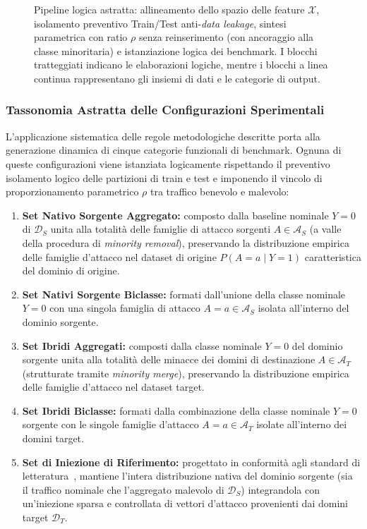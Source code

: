 \begin{figure}[H]
    \caption{Pipeline logica astratta: allineamento dello spazio delle feature $\mathcal{X}$, isolamento preventivo Train/Test anti-\textit{data leakage}, sintesi parametrica con ratio $\rho$ senza reinserimento (con ancoraggio alla classe minoritaria) e istanziazione logica dei benchmark. I blocchi tratteggiati indicano le elaborazioni logiche, mentre i blocchi a linea continua rappresentano gli insiemi di dati e le categorie di output.}
    \label{fig:flusso_benchmark}
\end{figure}

\subsubsection{Tassonomia Astratta delle Configurazioni Sperimentali}
\label{subsubsec:tassonomia_configurazioni}
L'applicazione sistematica delle regole metodologiche descritte porta alla generazione dinamica di cinque categorie funzionali di benchmark. Ognuna di queste configurazioni viene istanziata logicamente rispettando il preventivo isolamento logico delle partizioni di train e test e imponendo il vincolo di proporzionamento parametrico $\rho$ tra traffico benevolo e malevolo:
\begin{enumerate}
    \item \textbf{Set Nativo Sorgente Aggregato:} composto dalla baseline nominale $Y=0$ di $\mathcal{D}_S$ unita alla totalità delle famiglie di attacco sorgenti $A \in \mathcal{A}_S$ (a valle della procedura di \textit{minority removal}), preservando la distribuzione empirica delle famiglie d'attacco nel dataset di origine $P(A = a \mid Y = 1)$ caratteristica del dominio di origine.
    \item \textbf{Set Nativi Sorgente Biclasse:} formati dall'unione della classe nominale $Y=0$ con una singola famiglia di attacco $A = a \in \mathcal{A}_S$ isolata all'interno del dominio sorgente.
    \item \textbf{Set Ibridi Aggregati:} composti dalla classe nominale $Y=0$ del dominio sorgente unita alla totalità delle minacce dei domini di destinazione $A \in \mathcal{A}_T$ (strutturate tramite \textit{minority merge}), preservando la distribuzione empirica delle famiglie d'attacco nel dataset target.
    \item \textbf{Set Ibridi Biclasse:} formati dalla combinazione della classe nominale $Y=0$ sorgente con le singole famiglie d'attacco $A = a \in \mathcal{A}_T$ isolate all'interno dei domini target.
    \item \textbf{Set di Iniezione di Riferimento:} progettato in conformità agli standard di letteratura~\cite{azar2023}, mantiene l'intera distribuzione nativa del dominio sorgente (sia il traffico nominale che l'aggregato malevolo di $\mathcal{D}_S$) integrandola con un'iniezione sparsa e controllata di vettori d'attacco provenienti dai domini target $\mathcal{D}_T$.
\end{enumerate}

